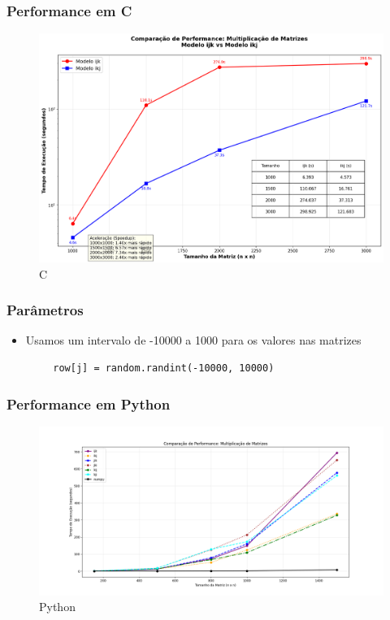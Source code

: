 \documentclass[11pt]{beamer}
\theoremstyle{definition}
\begin{document}
\begin{frame}
	\frametitle{Performance em C}
	\begin{figure}[H]
		\centering
		\includegraphics[width=0.65\linewidth]{Figuras/performance_multiplicacao_matrizes}
		\caption{C}
		\label{fig:performace_c}
	\end{figure}
	
\end{frame}

\begin{frame}[fragile]
	\frametitle{Parâmetros}
	\begin{itemize}
		\item Usamos um intervalo de -10000 a 1000 para os valores nas matrizes
	\end{itemize}
	\begin{lstlisting}
		row[j] = random.randint(-10000, 10000)
	\end{lstlisting}

\end{frame}


\begin{frame}
	\frametitle{Performance em Python}
	\begin{figure}[H]
		\centering
		\includegraphics[width=0.80\linewidth]{Figuras/cachemiss_python}
		\caption{Python}
		\label{fig:performace_python}
	\end{figure}
\end{frame}
\end{document}
